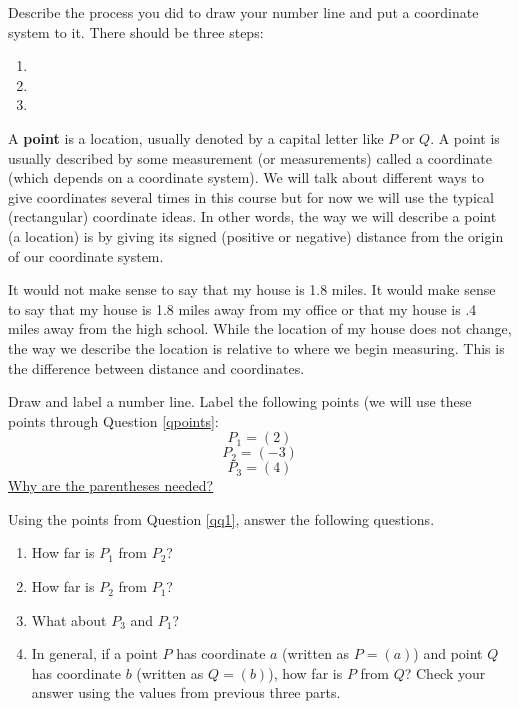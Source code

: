Describe the process you did to draw your number line and put a coordinate system to it. There should be three steps:
\begin{enumerate}
\item
\item
\item
\end{enumerate}
\eq

\begin{info} A \textbf{point} is a location, usually denoted by a capital letter like $P$ or $Q$. A point is usually described by some measurement (or measurements) called a coordinate (which depends on a coordinate system). We will talk about different ways to give coordinates several times in this course but for now we will use the typical (rectangular) coordinate ideas. In other words, the way we will describe a point (a location) is by giving its signed (positive or negative) distance from the origin of our coordinate system.

It would not make sense to say that my house is 1.8 miles. It would make sense to say that my house is 1.8 miles away from my office or that my house is .4 miles away from the high school. While the location of my house does not change, the way we describe the location is relative to where we begin measuring. This is the difference between distance and coordinates. \end{info}

\bq\label{qq1} Draw and label a number line. Label the following points (we will use these points through Question \ref{qpoints}:
$$P_1=(2)$$
$$P_2 =(-3)$$
$$P_3=(4)$$
\underline{Why are the parentheses needed?}
\eq

\bq Using the points from Question \ref{qq1}, answer the following questions.
\begin{enumerate}
\item How far is $P_1$ from $P_2$?
\item How far is $P_2$ from $P_1$?
\item What about $P_3$ and $P_1$?
\item In general, if a point $P$ has coordinate $a$ (written as $P=(a)$) and point $Q$ has coordinate $b$ (written as $Q=(b)$), how far is $P$ from $Q$? Check your answer using the values from previous three parts.
\end{enumerate}
\eq


